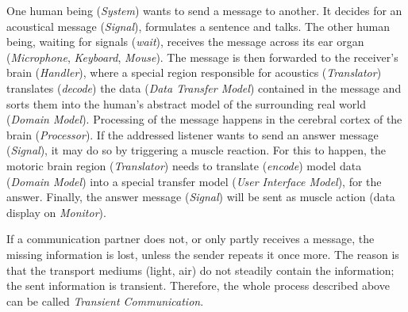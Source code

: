 One human being (\emph{System}) wants to send a message to another. It decides
for an acoustical message (\emph{Signal}), formulates a sentence and talks. The
other human being, waiting for signals (\emph{wait}), receives the message
across its ear organ (\emph{Microphone}, \emph{Keyboard}, \emph{Mouse}). The
message is then forwarded to the receiver's brain (\emph{Handler}), where a
special region responsible for acoustics (\emph{Translator}) translates
(\emph{decode}) the data (\emph{Data Transfer Model}) contained in the message
and sorts them into the human's abstract model of the surrounding real world
(\emph{Domain Model}). Processing of the message happens in the cerebral cortex
of the brain (\emph{Processor}). If the addressed listener wants to send an
answer message (\emph{Signal}), it may do so by triggering a muscle reaction.
For this to happen, the motoric brain region (\emph{Translator}) needs to
translate (\emph{encode}) model data (\emph{Domain Model}) into a special
transfer model (\emph{User Interface Model}), for the answer. Finally, the
answer message (\emph{Signal}) will be sent as muscle action (data display on
\emph{Monitor}).

If a communication partner does not, or only partly receives a message, the
missing information is lost, unless the sender repeats it once more. The reason
is that the transport mediums (light, air) do not steadily contain the
information; the sent information is transient. Therefore, the whole process
described above can be called \emph{Transient Communication}.
